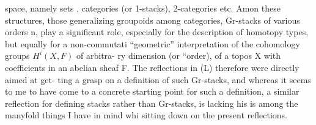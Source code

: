 
space, namely sets , categories (or 1-stacks), 2-categories etc. Amon
these structures, those generalizing groupoids among categories, 
Gr-stacks of various orders n, play a significant role, especially
for the description of homotopy types, but equally for a non-commutati
``geometric'' interpretation of the cohomology groups $H^i(X,F)$ of arbitra-%
ry dimension (or ``order), of a topos X with coefficients in an abelian
sheaf F. The reflections in (L) therefore were directly aimed at get-%
ting a grasp on a definition of such Gr-stacks, and whereas it seems to
me to have come to a concrete starting point for such a definition, a
similar reflection for defining  stacks  rather than Gr-stacks,
is  lacking  his is  among the manyfold things I have in mind whi
sitting down on the present reflections.

